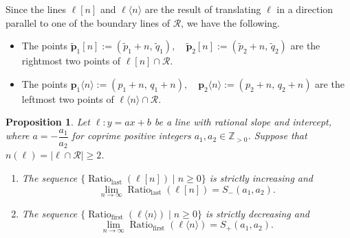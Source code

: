 \documentclass{article}
\newtheorem{prop}[theorem]{Proposition}
\theoremstyle{remark}
\begin{document}
Since the lines $\ell[n]$  and $\ell \langle n \rangle $ are the result of translating $\ell$ in a direction parallel to one of the boundary lines of $\mathcal{R}$, we have the following.
\begin{itemize}
   \item The points 
    $\widetilde{\mathbf{p}}_1[n] := (\widetilde{p}_1 + n,\, \widetilde{q}_1), \quad 
    \widetilde{\mathbf{p}}_2[n] := (\widetilde{p}_2 + n,\, \widetilde{q}_2)$ are the rightmost two points of  $ \ell[n] \cap \mathcal{R} $.
    \item The points 
    $\mathbf{p}_1\langle n\rangle := (p_1 + n,\, q_1 + n),  \quad
    \mathbf{p}_2\langle n\rangle := (p_2 + n,\, q_2 + n)$
are the leftmost two points of  $ \ell\langle n\rangle \cap \mathcal{R}$.
\end{itemize}

\begin{prop}\label{prop:firstlastratios}
Let $\ell:y=ax+b$ be a line with rational slope and intercept, where  $a=-\dfrac{a_1}{a_2}$ for coprime positive integers  $a_1,a_2 \in \mathbb{Z}_{>0}$. Suppose that $n(\ell)=|\ell\cap \mathcal R|\geq 2$. 
\begin{enumerate}
    \item[$(1)$] The sequence $\{\operatorname{Ratio}_{\mathrm{last}}(\ell[ n])\mid n\geq 0\}$ is strictly increasing and 
    \begin{equation}\label{eq:ratiolim1}
      \lim_{n\to \infty} \operatorname{Ratio}_{\mathrm{last}}(\ell[n])=S_-(a_1,a_2). 
    \end{equation}
     \item[$(2)$] The sequence $\{\operatorname{Ratio}_{\mathrm{first}}(\ell\langle n\rangle)\mid n\geq 0\}$ is strictly decreasing and 
    \begin{equation}\label{eq:ratiolim2}
      \lim_{n\to \infty} \operatorname{Ratio}_{\mathrm{first}}(\ell\langle n\rangle)=S_+(a_1,a_2). 
    \end{equation}
\end{enumerate}
  
\end{prop}
\end{document}
